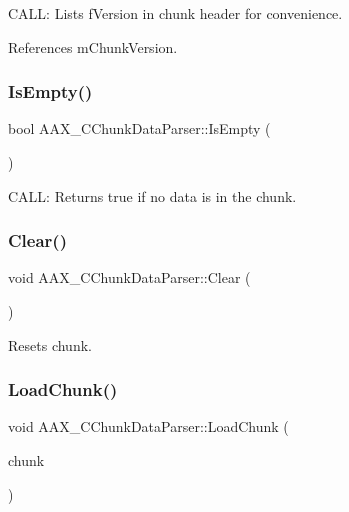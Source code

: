 C\+A\+LL\+: Lists f\+Version in chunk header for convenience. 



References m\+Chunk\+Version.

\mbox{\label{a01461_a88ab0773d25dad48ab6c693662243f47}} 
\subsubsection{\texorpdfstring{IsEmpty()}{IsEmpty()}}
{\footnotesize\ttfamily bool A\+A\+X\+\_\+\+C\+Chunk\+Data\+Parser\+::\+Is\+Empty (\begin{DoxyParamCaption}{ }\end{DoxyParamCaption})}



C\+A\+LL\+: Returns true if no data is in the chunk. 

\mbox{\label{a01461_a5718452d41c2292ba338b23ffc6cf29b}} 
\subsubsection{\texorpdfstring{Clear()}{Clear()}}
{\footnotesize\ttfamily void A\+A\+X\+\_\+\+C\+Chunk\+Data\+Parser\+::\+Clear (\begin{DoxyParamCaption}{ }\end{DoxyParamCaption})}



Resets chunk. 

\mbox{\label{a01461_a25fc41a1060445db4d7bee7a2919460d}} 
\subsubsection{\texorpdfstring{LoadChunk()}{LoadChunk()}}
{\footnotesize\ttfamily void A\+A\+X\+\_\+\+C\+Chunk\+Data\+Parser\+::\+Load\+Chunk (\begin{DoxyParamCaption}\item[{const \mbox{\hyperlink{a01421}{A\+A\+X\+\_\+\+S\+Plug\+In\+Chunk}} $\ast$}]{chunk }\end{DoxyParamCaption})}



